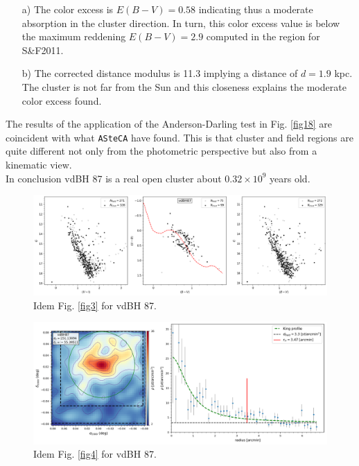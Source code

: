 \documentclass[draft]{aa}
\begin{document}
\begin{itemize}
\item [a)] The color excess is $E(B-V) = 0.58$ indicating thus a moderate
    absorption in the cluster direction. In turn, this color excess value is
    below the maximum reddening $E(B-V) = 2.9$ computed in the region for 
    S\&F2011.
\item [b)] The corrected distance modulus is 11.3 implying a distance of $d =
    1.9$ kpc. The cluster is not far from the Sun and this closeness explains
    the moderate color excess found.
\end{itemize}

The results of the application of the Anderson-Darling test in Fig. \ref{fig18}
are coincident with what \texttt{ASteCA} have found. This is that cluster and
field regions are quite different not only from the photometric perspective but
also from a kinematic view.\\

In conclusion vdBH 87 is a real open cluster about $0.32\times10^9$ years old.

\begin{figure}[ht]
    \centering
    \includegraphics[width=\hsize]{../figs/obs_vdBH87.png}
    \caption{Idem Fig. \ref{fig3} for vdBH 87.}
    \label{fig15}
\end{figure}

\begin{figure}[ht]
    \centering
    \includegraphics[width=\hsize]{../figs/dmap_vdbh87.png}
    \caption{Idem Fig. \ref{fig4} for vdBH 87.}
    \label{fig16}
\end{figure}
\end{document}
